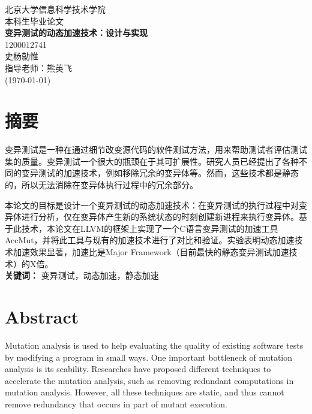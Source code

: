 \documentclass[nofonts]{ctexrep}
\begin{document}
%
\begin{titlepage}
\begin{center}
\LARGE

\vspace{20mm}
北京大学信息科学技术学院\\
\vspace{5mm}
本科生毕业论文\\
\vspace{70mm}
\textbf{\huge 变异测试的动态加速技术：设计与实现}\\
\vspace{20mm}
1200012741\\
史杨勍惟\\
\vspace{20mm}
指导老师：熊英飞\\
\vspace{10mm}
(\today)
\end{center}
\end{titlepage}


\large
\chapter*{摘要}
变异测试是一种在通过细节改变源代码的软件测试方法，用来帮助测试者评估测试集的质量。变异测试一个很大的瓶颈在于其可扩展性。研究人员已经提出了各种不同的变异测试的加速技术，例如移除冗余的变异体等。然而，这些技术都是静态的，所以无法消除在变异体执行过程中的冗余部分。

本论文的目标是设计一个变异测试的动态加速技术：在变异测试的执行过程中对变异体进行分析，仅在变异体产生新的系统状态的时刻创建新进程来执行变异体。基于此技术，本论文在LLVM的框架上实现了一个C语言变异测试的加速工具AccMut，并将此工具与现有的加速技术进行了对比和验证。实验表明动态加速技术加速效果显著，加速比是Major Framework（目前最快的静态变异测试加速技术）的X倍。\\

\textbf{关键词：} 变异测试，动态加速，静态加速
\chapter*{Abstract}
Mutation analysis is used to help evaluating the quality of existing software tests by modifying a program in small ways. One important bottleneck of mutation analysis is its scability. Researches have proposed different techniques to accelerate the mutation analysis, such as removing redundant computations in mutation analysis. However, all these techniques are static, and thus cannot remove redundancy that occurs in part of mutant execution. 
\end{document}
